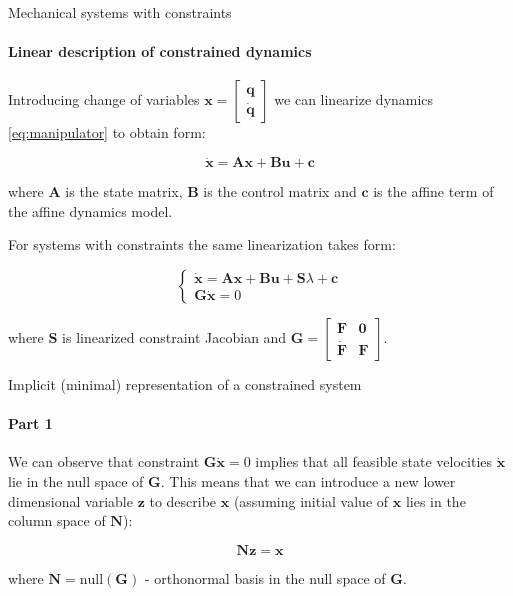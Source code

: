 \documentclass{beamer}
\begin{document}
\begin{frame}{Mechanical systems with constraints}
\framesubtitle{Linear description of constrained dynamics}
\begin{flushleft}

Introducing change of variables $\mathbf{x} = \begin{bmatrix} \mathbf{q} \\ \dot{\mathbf{q}} \end{bmatrix}$ we can linearize dynamics \eqref{eq:manipulator} to obtain form:

\begin{equation}
\label{eq:LTI}
    \dot{\mathbf{x}} = \mathbf{A} \mathbf{x} + \mathbf{B} \mathbf{u} + \mathbf{c}
\end{equation}

where $\mathbf{A}$ is the state matrix, $\mathbf{B}$ is the control matrix and $\mathbf{c}$ is the affine term of the affine dynamics model.

\bigskip

For systems with constraints the same linearization takes form:

\begin{equation}
\label{eq:CLTI}
\begin{cases}
    \dot{\mathbf{x}} = \mathbf{A} \mathbf{x} + \mathbf{B} \mathbf{u} + \mathbf{S} \lambda + \mathbf{c} \\
    \mathbf{G}\dot{\mathbf{x}} = 0
\end{cases}    
\end{equation}

where $\mathbf{S}$ is linearized constraint Jacobian and $\mathbf{G} = \begin{bmatrix} \mathbf{F} & \mathbf{0} \\ \dot{\mathbf{F}} & \mathbf{F} \end{bmatrix}$. 

\end{flushleft}
\end{frame}



\begin{frame}{Implicit (minimal) representation of a constrained system}
\framesubtitle{Part 1}
\begin{flushleft}

We can observe that constraint $\mathbf{G}\dot{\mathbf{x}} = 0$ implies that all feasible state velocities $\dot{\mathbf{x}}$ lie in the null space of $\mathbf{G}$. This means that we can introduce a new lower dimensional variable $\mathbf{z}$ to describe $\mathbf{x}$ (assuming initial value of $\mathbf{x}$ lies in the column space of $\mathbf{N}$):

\begin{equation}
    \mathbf{N}\mathbf{z} = \mathbf{x}
\end{equation}

where $\mathbf{N} = \text{null}(\mathbf{G})$ - orthonormal basis in the null space of $\mathbf{G}$. 
\end{flushleft}
\end{frame}
\end{document}

